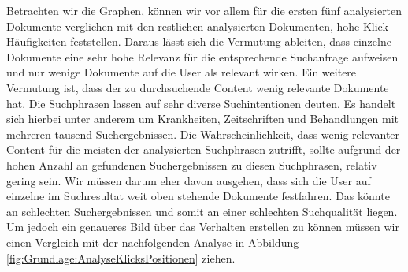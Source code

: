 Betrachten wir die Graphen, können wir vor allem für die ersten fünf analysierten Dokumente verglichen mit den restlichen analysierten Dokumenten, hohe Klick-Häufigkeiten feststellen. Daraus lässt sich die Vermutung ableiten, dass einzelne Dokumente eine sehr hohe Relevanz für die entsprechende Suchanfrage aufweisen und nur wenige Dokumente auf die User als relevant wirken. Ein weitere Vermutung ist, dass der zu durchsuchende Content wenig relevante Dokumente hat. Die Suchphrasen lassen auf sehr diverse Suchintentionen deuten. Es handelt sich hierbei unter anderem um Krankheiten, Zeitschriften und Behandlungen mit mehreren tausend Suchergebnissen. Die Wahrscheinlichkeit, dass wenig relevanter Content für die meisten der analysierten Suchphrasen zutrifft, sollte aufgrund der hohen Anzahl an gefundenen Suchergebnissen zu diesen Suchphrasen, relativ gering sein. Wir müssen darum eher davon ausgehen, dass sich die User auf einzelne im Suchresultat weit oben stehende Dokumente festfahren. Das könnte an schlechten Suchergebnissen und somit an einer schlechten Suchqualität liegen. Um jedoch ein genaueres Bild über das Verhalten erstellen zu können müssen wir einen Vergleich mit der nachfolgenden Analyse in Abbildung \ref{fig:Grundlage:AnalyseKlicksPositionen} ziehen.